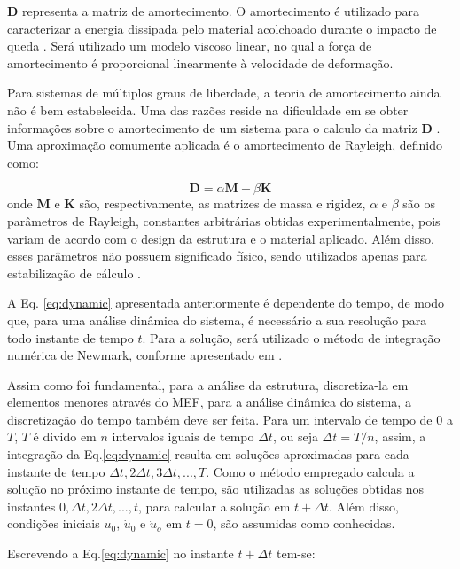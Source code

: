 $\pmb{D}$ representa a matriz de amortecimento. O amortecimento é utilizado para caracterizar a energia dissipada pelo material acolchoado durante o impacto de queda \cite{ge2018impact}. Será utilizado um modelo viscoso linear, no qual a força de amortecimento é proporcional linearmente à velocidade de deformação. 

Para sistemas de múltiplos graus de liberdade, a teoria de amortecimento ainda não é bem estabelecida. Uma das razões reside na dificuldade em se obter informações sobre o amortecimento de um sistema para o calculo da matriz $\pmb{D}$ \cite{liu1995formulation}.
Uma aproximação comumente aplicada é o amortecimento de Rayleigh, definido como:

\begin{equation} \label{eq:damping}
\pmb{D} = \alpha \pmb{M} + \beta \pmb{K}
\end{equation}
onde $\pmb{M}$ e $\pmb{K}$ são, respectivamente, as matrizes de massa e rigidez, $\alpha$ e $\beta$ são os parâmetros de Rayleigh, constantes arbitrárias obtidas experimentalmente, pois variam de acordo com o design da estrutura e o material aplicado. Além disso, esses parâmetros não possuem significado físico, sendo utilizados apenas para estabilização de cálculo \cite{Chen2017numerical}.

A Eq. \ref{eq:dynamic} apresentada anteriormente é dependente do tempo, de modo que, para uma análise dinâmica do sistema, é necessário a sua resolução para todo instante de tempo $t$. Para a solução, será utilizado o método de integração numérica de Newmark, conforme apresentado em \cite{bathe2006finite}.

Assim como foi fundamental, para a análise da estrutura, discretiza-la em elementos menores através do MEF, para a análise dinâmica do sistema, a discretização do tempo também deve ser feita.
Para um intervalo de tempo de $0$ a $T$, $T$ é divido em $n$ intervalos iguais de tempo $\Delta t$, ou seja $\Delta t = T/n$, assim, a integração da Eq.\ref{eq:dynamic} resulta em soluções aproximadas para cada instante de tempo $\Delta t, 2\Delta t, 3\Delta t, ..., T$.
Como o método empregado calcula a solução no próximo instante de tempo, são utilizadas as soluções obtidas nos instantes $0, \Delta t, 2\Delta t, ..., t$, para calcular a solução em $t + \Delta t$. Além disso, condições iniciais $u_{0}$, $\dot{u}_{0}$ e $\ddot{u}_{o}$ em $t = 0$, são assumidas como conhecidas.

Escrevendo a Eq.\ref{eq:dynamic} no instante $t + \Delta t$ tem-se:

